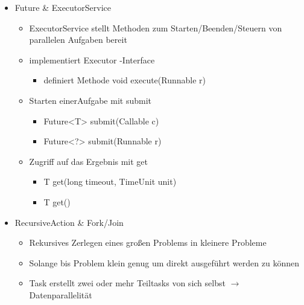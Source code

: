 \documentclass[10pt]{article}
\begin{document}
\begin{itemize}
\begin{itemize}
\begin{itemize}
                        \begin{lstlisting}[
        language=java,
        showspaces=false,
        basicstyle=\ttfamily
     ]
    Runnable task = () $\rightarrow$ {
        String me = Thread.currentThread().getName();
        System.out.println("Hallo " + me);
    };
    task.run();
    Thread thread = new Thread(task);
    thread.start();
    \end{lstlisting}
                \end{itemize}
          \item Future \& ExecutorService
                \begin{itemize}
                  \item ExecutorService stellt Methoden zum Starten/Beenden/Steuern von parallelen Aufgaben bereit
                  \item implementiert Executor -Interface
                        \begin{itemize}
                          \item definiert Methode void execute(Runnable r)
                        \end{itemize}
                  \item  Starten einerAufgabe mit submit
                        \begin{itemize}
                          \item Future<T> submit(Callable c)
                          \item Future<?> submit(Runnable r)
                        \end{itemize}
                  \item Zugriff auf das Ergebnis mit get
                        \begin{itemize}
                          \item T get(long timeout, TimeUnit unit)
                          \item T get()
                        \end{itemize}
                \end{itemize}
          \item RecursiveAction \& Fork/Join
                \begin{itemize}
                  \item Rekursives Zerlegen eines großen Problems in kleinere Probleme
                  \item Solange bis Problem klein genug um direkt ausgeführt werden zu können
                  \item Task erstellt zwei oder mehr Teiltasks von sich selbst $\rightarrow$ Datenparallelität

\end{itemize}
\end{itemize}
\end{itemize}
\end{document}
